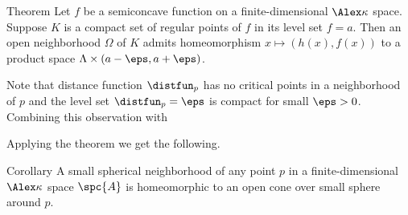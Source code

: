 \begin{thm}{Theorem}
Let $f$ be a semiconcave function on a finite-dimensional $\Alex\kappa$ space.
Suppose $K$ is a compact set of regular points of $f$ in its level set $f=a$.
Then an open neighborhood $\Omega$ of $K$ admits homeomorphism $x\mapsto (h(x),f(x))$ to a product space $\Lambda\times (a-\eps,a+\eps)$.

\end{thm}

Note that distance function $\distfun_p$ has no critical points in a neighborhood of $p$ and the level set $\distfun_p=\eps$ is compact for small $\eps>0$.
Combining this observation with 

Applying the theorem we get the following.

\begin{thm}{Corollary}
A small spherical neighborhood of any point $p$ in a finite-dimensional $\Alex\kappa$ space $\spc{A}$ is homeomorphic to an open cone over small sphere around $p$.
\end{thm}
